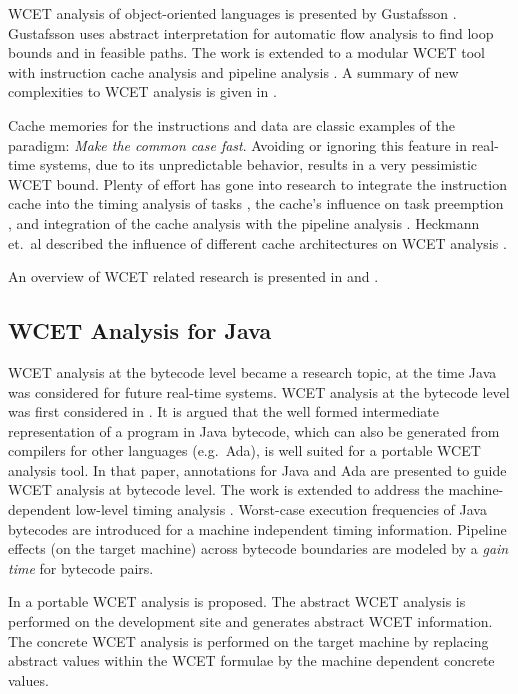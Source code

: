 WCET analysis of object-oriented languages is presented by Gustafsson
\cite{gustafsson:phd}. Gustafsson uses abstract interpretation for
automatic flow analysis to find loop bounds and in feasible paths.
The work is extended to a modular WCET tool with instruction cache
analysis and pipeline analysis \cite{eng:jnl:2003}.
A summary of new complexities to WCET analysis is given in
\cite{gustafsson:words:2002}.


Cache memories for the instructions and data are classic examples of
the paradigm: \emph{Make the common case fast}. Avoiding or ignoring
this feature in real-time systems, due to its unpredictable behavior,
results in a very pessimistic WCET bound. Plenty of effort has gone
into research to integrate the instruction cache into the timing
analysis of tasks \cite{Arnold1994,Healy1995}, the cache's influence
on task preemption \cite{279589,Mataix:1996}, and integration of the
cache analysis with the pipeline analysis \cite{wcet:healy:1999}.
Heckmann et.\ al described the influence of different cache
architectures on WCET analysis \cite{Heckmann:IEEE2003}.

An overview of WCET related research is presented in
\cite{R:Puschner:2000} and \cite{tecs:wcet:overview}.



\subsection{WCET Analysis for Java}

WCET analysis at the bytecode level became a research topic, at the
time Java was considered for future real-time systems. WCET analysis
at the bytecode level was first considered in \cite{R:Bernat:2000a}.
It is argued that the well formed intermediate representation of a
program in Java bytecode, which can also be generated from compilers
for other languages (e.g.\ Ada), is well suited for a portable WCET
analysis tool. In that paper, annotations for Java and Ada are
presented to guide WCET analysis at bytecode level. The work is
extended to address the machine-dependent low-level timing analysis
\cite{R:Bate:2000a}. Worst-case execution frequencies of Java
bytecodes are introduced for a machine independent timing
information. Pipeline effects (on the target machine) across bytecode
boundaries are modeled by a \emph{gain time} for bytecode pairs.

In \cite{871917} a portable WCET analysis is proposed. The abstract
WCET analysis is performed on the development site and generates
abstract WCET information.
%
%
The concrete WCET analysis is performed on the target machine by
replacing abstract values within the WCET formulae by the machine
dependent concrete values.

